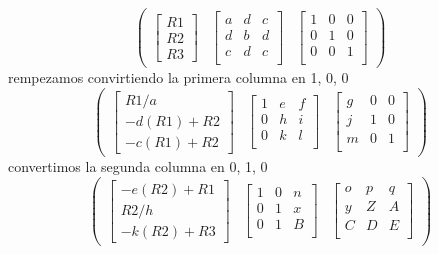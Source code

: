 \documentclass{article}
\begin{document}
\[
\begin{pmatrix}
\begin{bmatrix}
  R1 \\
  R2 \\
  R3
\end{bmatrix}
&
\begin{bmatrix}
a  & d & c\\
d & b & d\\
c & d & c \\
\end{bmatrix}
&
\begin{bmatrix}
  1 & 0 & 0\\
  0 & 1 & 0 \\
  0 & 0 & 1 \\
\end{bmatrix}
\end{pmatrix}
\]
rempezamos convirtiendo la primera columna en 1, 0, 0
\[
\begin{pmatrix}
\begin{bmatrix}
  R1/a \\
  -d(R1)+R2 \\
  -c(R1)+R2
\end{bmatrix}
&
\begin{bmatrix}
1  & e & f\\
0 & h & i\\
0 & k & l \\
\end{bmatrix}
&
\begin{bmatrix}
  g & 0 & 0\\
  j & 1 & 0 \\
  m & 0 & 1 \\
\end{bmatrix}
\end{pmatrix}
\]
convertimos la segunda columna en 0, 1, 0
\[
\begin{pmatrix}
\begin{bmatrix}
  -e(R2)+R1 \\
  R2/h \\
  -k(R2)+R3
\end{bmatrix}
&
\begin{bmatrix}
1 & 0 & n\\
0 & 1 & x\\
0 & 1 & B \\
\end{bmatrix}
&
\begin{bmatrix}
  o & p & q\\
  y & Z & A \\
  C & D & E \\
\end{bmatrix}
\end{pmatrix}
\]
\end{document}
